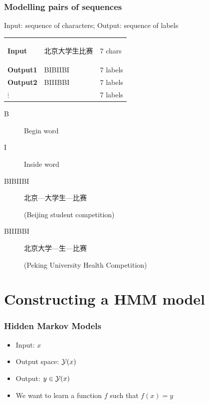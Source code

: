 \begin{frame}
\frametitle{Modelling pairs of sequences}
\begin{block}{Input: sequence of characters; Output: sequence of labels}
\begin{tabular}{lll}
\textbf{Input} & 
\begin{CJK*}{UTF8}{gbsn}
北京大学生比赛
\end{CJK*} & 7 chars \pause \\
\textbf{Output1} & 
BIBIIBI & 7 labels \\
\textbf{Output2} & 
BIIIBBI & 7 labels \\ 
$\vdots$ & & 7 labels 
\end{tabular}
\begin{description}
\item[B] Begin word
\item[I] Inside word
\end{description}
\pause 
\begin{description}
\item[BIBIIBI] 
\begin{CJK*}{UTF8}{gbsn}
北京---大学生---比赛
\end{CJK*}
(Beijing student competition)
\item[BIIIBBI] 
\begin{CJK*}{UTF8}{gbsn}
北京大学---生---比赛 
\end{CJK*}
(Peking University Health Competition)
\end{description}
\end{block}
\end{frame}

\section{Constructing a HMM model}
\begin{frame}
\frametitle{Hidden Markov Models}
\begin{block}{}
\begin{itemize}[<+->]
\item Input: $x$
\item Output space: ${\cal Y}(x)$
\item Output: $y \in {\cal Y}(x)$
\item We want to learn a function $f$ such that $f(x) = y$
\end{itemize}
\end{block}
\end{frame}

